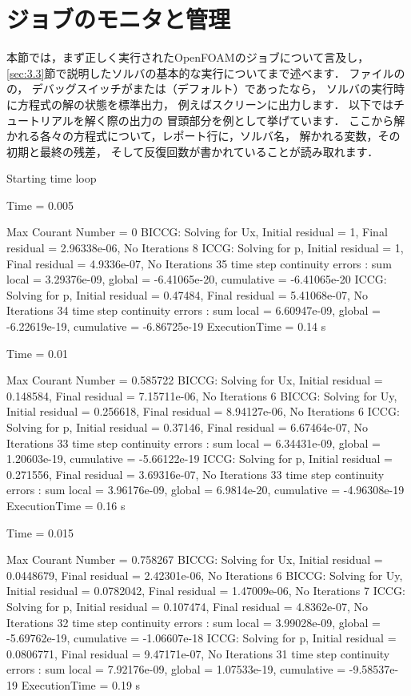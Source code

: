 \section{ジョブのモニタと管理}
\label{sec:6.6}
本節では，まず正しく実行されたOpenFOAMのジョブについて言及し，
\autoref{sec:3.3}節で説明したソルバの基本的な実行についてまで述べます．
ファイルの
の，
デバッグスイッチがまたは（デフォルト）であったなら，
ソルバの実行時に方程式の解の状態を標準出力，
例えばスクリーンに出力します．
以下ではチュートリアルを解く際の出力の
冒頭部分を例として挙げています．
ここから解かれる各々の方程式について，レポート行に，ソルバ名，
解かれる変数，その初期と最終の残差，
そして反復回数が書かれていることが読み取れます．
\begin{OFverbatim}[baselinestretch=0.8, leftskip=3em, weight=\small]
    Starting time loop

Time = 0.005

Max Courant Number = 0
BICCG: Solving for Ux, Initial residual = 1, Final residual = 2.96338e-06, No Iterations 8
ICCG: Solving for p, Initial residual = 1, Final residual = 4.9336e-07, No Iterations 35
time step continuity errors : sum local = 3.29376e-09, global = -6.41065e-20, cumulative = -6.41065e-20
ICCG: Solving for p, Initial residual = 0.47484, Final residual = 5.41068e-07, No Iterations 34
time step continuity errors : sum local = 6.60947e-09, global = -6.22619e-19, cumulative = -6.86725e-19
ExecutionTime = 0.14 s

Time = 0.01

Max Courant Number = 0.585722
BICCG: Solving for Ux, Initial residual = 0.148584, Final residual = 7.15711e-06, No Iterations 6
BICCG: Solving for Uy, Initial residual = 0.256618, Final residual = 8.94127e-06, No Iterations 6
ICCG: Solving for p, Initial residual = 0.37146, Final residual = 6.67464e-07, No Iterations 33
time step continuity errors : sum local = 6.34431e-09, global = 1.20603e-19, cumulative = -5.66122e-19
ICCG: Solving for p, Initial residual = 0.271556, Final residual = 3.69316e-07, No Iterations 33
time step continuity errors : sum local = 3.96176e-09, global = 6.9814e-20, cumulative = -4.96308e-19
ExecutionTime = 0.16 s

Time = 0.015

Max Courant Number = 0.758267
BICCG: Solving for Ux, Initial residual = 0.0448679, Final residual = 2.42301e-06, No Iterations 6
BICCG: Solving for Uy, Initial residual = 0.0782042, Final residual = 1.47009e-06, No Iterations 7
ICCG: Solving for p, Initial residual = 0.107474, Final residual = 4.8362e-07, No Iterations 32
time step continuity errors : sum local = 3.99028e-09, global = -5.69762e-19, cumulative = -1.06607e-18
ICCG: Solving for p, Initial residual = 0.0806771, Final residual = 9.47171e-07, No Iterations 31
time step continuity errors : sum local = 7.92176e-09, global = 1.07533e-19, cumulative = -9.58537e-19
ExecutionTime = 0.19 s
\end{OFverbatim}


